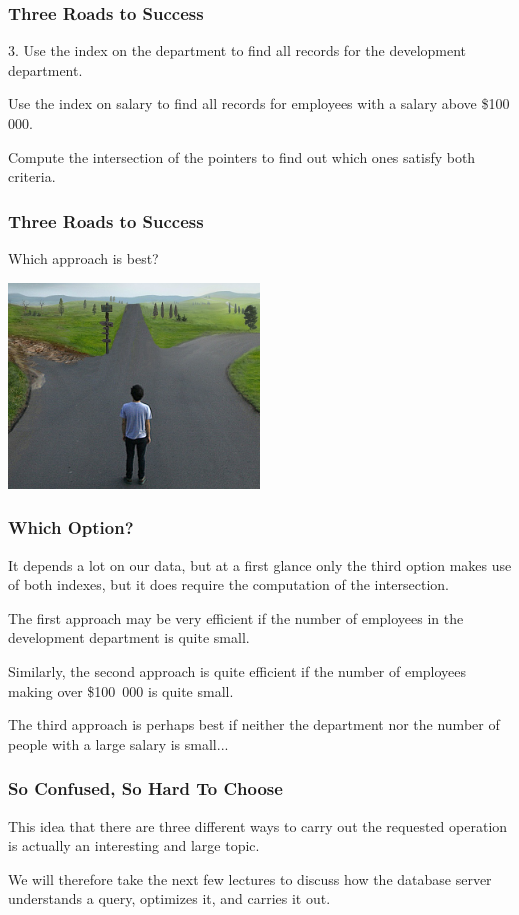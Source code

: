 \begin{frame}
\frametitle{Three Roads to Success}
	3. Use the index on the department to find all records for the development department. 
	
	Use the index on salary to find all records for employees with a salary above \$100 000. 
	
	Compute the intersection of the pointers to find out which ones satisfy both criteria.

\end{frame}

\begin{frame}
\frametitle{Three Roads to Success}

Which approach is best?


\begin{center}
	\includegraphics[width=0.5\textwidth]{images/threeways.png}
\end{center}

\end{frame}

\begin{frame}
\frametitle{Which Option?}

It depends a lot on our data, but at a first glance only the third option makes use of both indexes, but it does require the computation of the intersection. 

The first approach may be very efficient if the number of employees in the development department is quite small. 

Similarly, the second approach is quite efficient if the number of employees making over \$100~000 is quite small. 

The third approach is perhaps best if neither the department nor the number of people with a large salary is small...

\end{frame}

\begin{frame}
\frametitle{So Confused, So Hard To Choose}

This idea that there are three different ways to carry out the requested operation is actually an interesting and large topic. 

We will therefore take the next few lectures to discuss how the database server understands a query, optimizes it, and carries it out. 


\end{frame}




